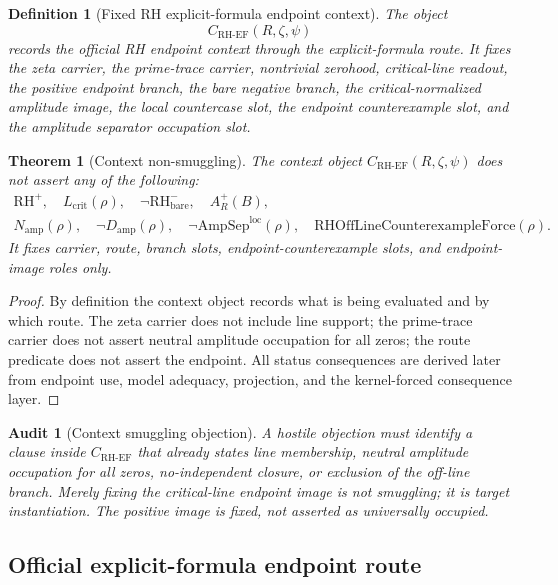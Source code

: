 \documentclass[11pt]{article}
\newtheorem{definition}{Definition}[section]
\newtheorem{theorem}{Theorem}[section]
\newtheorem{audit}{Audit}[section]
\newcommand{\Lcrit}{L_{\mathrm{crit}}}
\newcommand{\RH}{\mathrm{RH}}
\newcommand{\RHOffCxForce}{\mathrm{RHOffLineCounterexampleForce}}
\newcommand{\Aplus}{A^+}
\newcommand{\CRHEF}{C_{\mathrm{RH}\text{-}\mathrm{EF}}}
\newcommand{\AmpSepLoc}{\mathrm{AmpSep}^{\mathrm{loc}}}
\newcommand{\Damp}{D_{\mathrm{amp}}}
\newcommand{\Namp}{N_{\mathrm{amp}}}
\begin{document}
\begin{definition}[Fixed RH explicit-formula endpoint context]
The object
\[
\CRHEF(R,\zeta,\psi)
\]
records the official RH endpoint context through the explicit-formula route.  It fixes the zeta carrier, the prime-trace carrier, nontrivial zerohood, critical-line readout, the positive endpoint branch, the bare negative branch, the critical-normalized amplitude image, the local countercase slot, the endpoint counterexample slot, and the amplitude separator occupation slot.
\end{definition}

\begin{theorem}[Context non-smuggling]
The context object \(\CRHEF(R,\zeta,\psi)\) does not assert any of the following:
\[
\begin{gathered}
\RH^+,
\quad \Lcrit(\rho),
\quad \neg\RH^-_{\mathrm{bare}},
\quad \Aplus_R(B),\\
\Namp(\rho),
\quad \neg\Damp(\rho),
\quad \neg\AmpSepLoc(\rho),
\quad \RHOffCxForce(\rho).
\end{gathered}
\]
It fixes carrier, route, branch slots, endpoint-counterexample slots, and endpoint-image roles only.
\end{theorem}

\begin{proof}
By definition the context object records what is being evaluated and by which route.  The zeta carrier does not include line support; the prime-trace carrier does not assert neutral amplitude occupation for all zeros; the route predicate does not assert the endpoint.  All status consequences are derived later from endpoint use, model adequacy, projection, and the kernel-forced consequence layer.
\end{proof}

\begin{audit}[Context smuggling objection]
A hostile objection must identify a clause inside \(\CRHEF\) that already states line membership, neutral amplitude occupation for all zeros, no-independent closure, or exclusion of the off-line branch.  Merely fixing the critical-line endpoint image is not smuggling; it is target instantiation.  The positive image is fixed, not asserted as universally occupied.
\end{audit}

\subsection{Official explicit-formula endpoint route}
\end{document}
